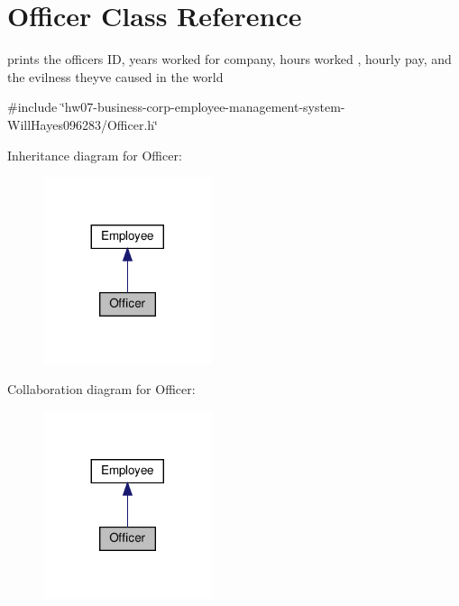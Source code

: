 \hypertarget{classOfficer}{}\section{Officer Class Reference}
\label{classOfficer}


prints the officer\textquotesingle{}s ID, years worked for company, hours worked , hourly pay, and the evilness they\textquotesingle{}ve caused in the world  




{\ttfamily \#include \char`\"{}hw07-\/business-\/corp-\/employee-\/management-\/system-\/\+Will\+Hayes096283/\+Officer.\+h\char`\"{}}



Inheritance diagram for Officer\+:\nopagebreak
\begin{figure}[H]
\begin{center}
\leavevmode
\includegraphics[width=140pt]{classOfficer__inherit__graph}
\end{center}
\end{figure}


Collaboration diagram for Officer\+:\nopagebreak
\begin{figure}[H]
\begin{center}
\leavevmode
\includegraphics[width=140pt]{classOfficer__coll__graph}
\end{center}
\end{figure}
